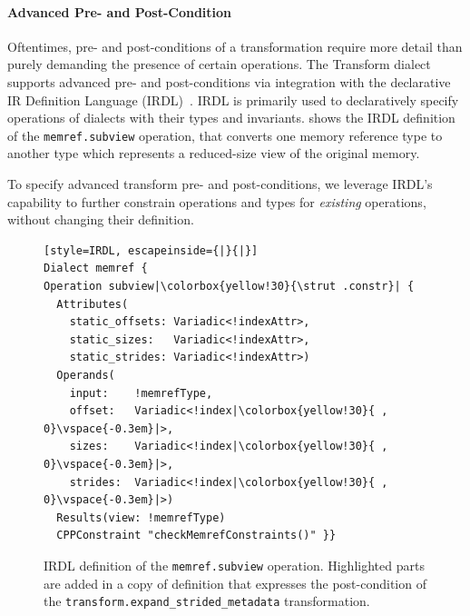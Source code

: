 \documentclass[screen,nonacm,authorversion]{acmart}
\begin{document}
\paragraph{Advanced Pre- and Post-Condition}
Oftentimes, pre- and post-conditions of a transformation require more detail than purely demanding the presence of certain operations.
The Transform dialect supports advanced pre- and post-conditions via integration with the declarative IR Definition Language (IRDL)~\cite{irdl}.
IRDL is primarily used to declaratively specify operations of dialects with their types and invariants.
 shows the IRDL definition of the \texttt{memref.subview} operation, that converts one memory reference type to another type which represents a reduced-size view of the original memory.

To specify advanced transform pre- and post-conditions, we leverage IRDL's capability to further constrain operations and types for \emph{existing} operations, without changing their definition.

\begin{figure}
\centering















\begin{lstlisting}[style=IRDL, escapeinside={|}{|}]
Dialect memref {
Operation subview|\colorbox{yellow!30}{\strut .constr}| {
  Attributes(
    static_offsets: Variadic<!indexAttr>,
    static_sizes:   Variadic<!indexAttr>,
    static_strides: Variadic<!indexAttr>)
  Operands(
    input:    !memrefType,
    offset:   Variadic<!index|\colorbox{yellow!30}{ , 0}\vspace{-0.3em}|>,
    sizes:    Variadic<!index|\colorbox{yellow!30}{ , 0}\vspace{-0.3em}|>,
    strides:  Variadic<!index|\colorbox{yellow!30}{ , 0}\vspace{-0.3em}|>)
  Results(view: !memrefType)
  CPPConstraint "checkMemrefConstraints()" }}
\end{lstlisting}


\caption{IRDL definition of the \texttt{memref.subview} operation. Highlighted parts are added in a copy of definition that expresses the post-condition of the \texttt{transform.expand\_strided\_metadata} transformation.}
\label{fig:memref_subview_def}
\end{figure}
\end{document}
